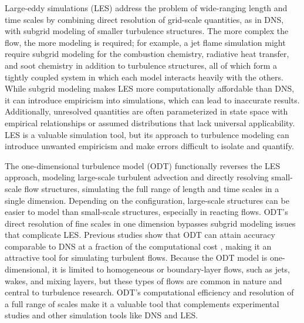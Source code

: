 \documentclass[preprint,12pt, a4paper]{elsarticle}
\begin{document}
Large-eddy simulations (LES) address the problem of wide-ranging length and time scales by combining  direct resolution of grid-scale quantities, as in DNS, with subgrid modeling of smaller turbulence structures. The more complex the flow, the more modeling is required; for example, a jet flame simulation might require subgrid modeling for the combustion chemistry, radiative heat transfer, and soot chemistry in addition to turbulence structures, all of which form a tightly coupled system in which each model interacts heavily with the others. While subgrid modeling makes LES more computationally affordable than DNS, it can introduce empiricism into simulations, which can lead to inaccurate results. Additionally, unresolved quantities are often parameterized in state space with empirical relationships or assumed distributions that lack universal applicability. LES is a valuable simulation tool, but its approach to turbulence modeling can introduce unwanted empiricism and make errors difficult to isolate and quantify.

The one-dimensional turbulence model (ODT) functionally reverses the LES approach, modeling large-scale turbulent advection and directly resolving small-scale flow structures, simulating the full range of length and time scales in a single dimension. Depending on the configuration, large-scale structures can be easier to model than small-scale structures, especially in reacting flows. ODT's direct resolution of fine scales in one dimension bypasses subgrid modeling issues that complicate LES. Previous studies show that ODT can attain accuracy comparable to DNS at a fraction of the computational cost \cite{Lignell_2015,Abboud_2015}, making it an attractive tool for simulating turbulent flows. Because the ODT model is one-dimensional, it is limited to homogeneous or boundary-layer flows, such as jets, wakes, and mixing layers, but these types of flows are common in nature and central to turbulence research. ODT's computational efficiency and resolution of a full range of scales make it a valuable tool that complements experimental studies and other simulation tools like DNS and LES. 
\end{document}
